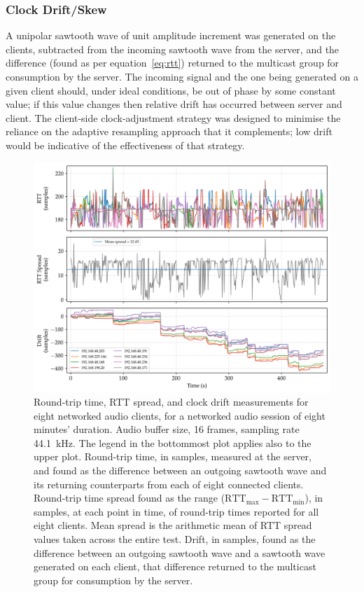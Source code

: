 \documentclass[utf8]{FrontiersinHarvard}
\begin{document}
    \subsubsection{Clock Drift/Skew}
    A unipolar sawtooth wave of unit amplitude increment was generated on the
    clients, subtracted from the incoming sawtooth wave from the server, and the
    difference (found as per equation~\eqref{eq:rtt}) returned to the multicast
    group for consumption by the server.
    The incoming signal and the one being generated on a given client should, under
    ideal conditions, be out of phase by some constant value;
    if this value changes then relative drift has occurred between server and
    client.
    The client-side clock-adjustment strategy was designed to minimise the reliance
    on the adaptive resampling approach that it complements;
    low drift would be indicative of the effectiveness of that strategy.

    \begin{figure}[h]
        \centering
        \includegraphics[width=\textwidth]{figures/rtt_drift_16}
        \caption{
            Round-trip time, RTT spread, and clock drift measurements for eight
            networked audio clients, for a networked audio session of eight minutes'
            duration.
            Audio buffer size, 16 frames, sampling rate \qty{44.1}{\kHz}.
            The legend in the bottommost plot applies also to the upper plot.
            Round-trip time, in samples, measured at the server, and found as the
            difference between an outgoing sawtooth wave and its returning
            counterparts from each of eight connected clients.
            Round-trip time spread found as the range ($\text{RTT}_{\max} -
            \text{RTT}_{\min}$), in samples, at each point in time, of
            round-trip times reported for all eight clients.
            Mean spread is the arithmetic mean of RTT spread values taken across
            the entire test.
            Drift, in samples, found as the difference between an outgoing sawtooth
            wave and a sawtooth wave generated on each client, that difference
            returned to the multicast group for consumption by the server.
        }
        \label{fig:rtt-drift-16}
    \end{figure}
\end{document}

